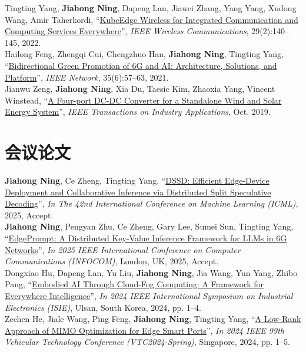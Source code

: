 \documentclass{resume}
\begin{document}
Tingting Yang, \textbf{Jiahong Ning}, Dapeng Lan, Jiawei Zhang, Yang Yang, Xudong Wang, Amir Taherkordi, “\href{https://doi.org/10.1109/MWC.004.2100038}{KubeEdge Wireless for Integrated Communication and Computing Services Everywhere}”, \emph{IEEE Wireless Communications}, 29(2):140--145, 2022.\\

Hailong Feng, Zhengqi Cui, Chengzhuo Han, \textbf{Jiahong Ning}, Tingting Yang, “\href{https://doi.org/10.1109/MNET.101.2100285}{Bidirectional Green Promotion of 6G and AI: Architecture, Solutions, and Platform}”, \emph{IEEE Network}, 35(6):57--63, 2021.\\

Jianwu Zeng, \textbf{Jiahong Ning}, Xia Du, Taesic Kim, Zhaoxia Yang, Vincent Winstead, “\href{https://doi.org/10.1109/TIA.2019.2948125}{A Four-port DC-DC Converter for a Standalone Wind and Solar Energy System}”, \emph{IEEE Transactions on Industry Applications}, Oct. 2019.\\
\vspace{3mm}
\section{会议论文}

\textbf{Jiahong Ning}, Ce Zheng, Tingting Yang, “\href{https://arxiv.org/abs/2507.12000}{DSSD: Efficient Edge-Device Deployment and Collaborative Inference via Distributed Split Speculative Decoding}”, \emph{In The 42nd International Conference on Machine Learning (ICML)}, 2025, Accept.\\

\textbf{Jiahong Ning}, Pengyan Zhu, Ce Zheng, Gary Lee, Sumei Sun, Tingting Yang, “\href{https://arxiv.org/abs/2504.11729}{EdgePrompt: A Distributed Key-Value Inference Framework for LLMs in 6G Networks}”, \emph{In 2025 IEEE International Conference on Computer Communications (INFOCOM)}, London, UK, 2025, Accept.\\

Dongxiao Hu, Dapeng Lan, Yu Liu, \textbf{Jiahong Ning}, Jia Wang, Yun Yang, Zhibo Pang, ``\href{https://dblp.org/rec/conf/isie/HuLLNWYP24}{Embodied AI Through Cloud-Fog Computing: A Framework for Everywhere Intelligence}'', \emph{In 2024 IEEE International Symposium on Industrial Electronics (ISIE)}, Ulsan, South Korea, 2024, pp. 1--4.\\

Zechen He, Jiale Wang, Ping Feng, \textbf{Jiahong Ning}, Tingting Yang, ``\href{https://dblp.org/rec/conf/vtc/HeWFNY24}{A Low-Rank Approach of MIMO Optimization for Edge Smart Ports}'', \emph{In 2024 IEEE 99th Vehicular Technology Conference (VTC2024-Spring)}, Singapore, 2024, pp. 1--5.\\
\end{document}
